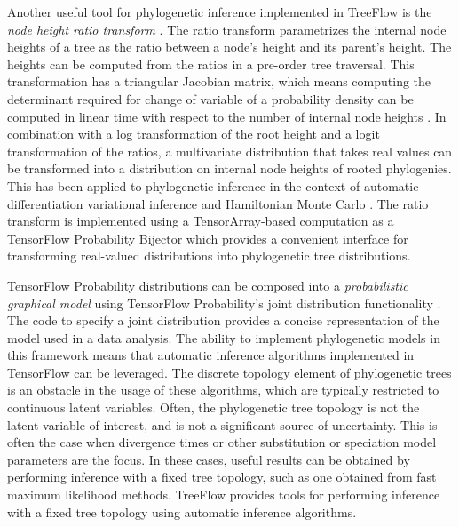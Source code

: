 Another useful tool for phylogenetic inference implemented in TreeFlow is the \textit{node height ratio transform} \cite{kishino2001performance}. The ratio transform parametrizes the internal node heights of a tree as the ratio between a node's height and its parent's height. The heights can be computed from the ratios in a pre-order tree traversal. This transformation has a triangular Jacobian matrix, which means computing the determinant required for change of variable of a probability density can be computed in linear time with respect to the number of internal node heights \cite{fourment2019evaluating}. In combination with a log transformation of the root height and a logit transformation of the ratios, a multivariate distribution that takes real values can be transformed into a distribution on internal node heights of rooted phylogenies. This has been applied to phylogenetic inference in the context of automatic differentiation variational inference \cite{fourment2019evaluating} and Hamiltonian Monte Carlo \cite{ji2021scalable}. The ratio transform is implemented using a TensorArray-based computation as a TensorFlow Probability Bijector which provides a convenient interface for transforming real-valued distributions into phylogenetic tree distributions.

TensorFlow Probability distributions can be composed into a \textit{probabilistic graphical model} using TensorFlow Probability's joint distribution functionality \cite{piponi2020joint}. The code to specify a joint distribution provides a concise representation of the model used in a data analysis. The ability to implement phylogenetic models in this framework means that automatic inference algorithms implemented in TensorFlow can be leveraged. The discrete topology element of phylogenetic trees is an obstacle in the usage of these algorithms, which are typically restricted to continuous latent variables. Often, the phylogenetic tree topology is not the latent variable of interest, and is not a significant source of uncertainty. This is often the case when divergence times or other substitution or speciation model parameters are the focus. In these cases, useful results can be obtained by performing inference with a fixed tree topology, such as one obtained from fast maximum likelihood methods. TreeFlow provides tools for performing inference with a fixed tree topology using automatic inference algorithms.

